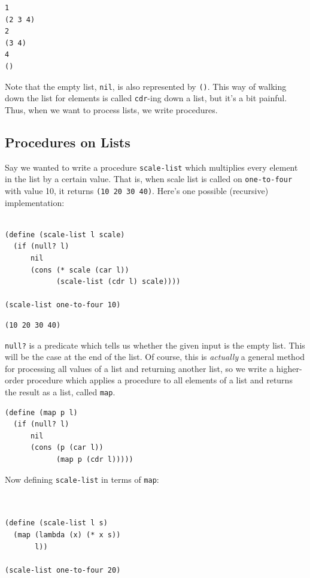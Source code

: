 \documentclass[9pt]{report}
\begin{document}
\begin{verbatim}
1
(2 3 4)
2
(3 4)
4
()
\end{verbatim}


Note that the empty list, \texttt{nil}, is also represented by \texttt{()}. This
way of walking down the list for elements is called \texttt{cdr}-ing down
a list, but it's a bit painful. Thus, when we want to process
lists, we write procedures.

\subsection{Procedures on Lists}
\label{sec:org3c9b0e9}

Say we wanted to write a procedure \texttt{scale-list} which multiplies
every element in the list by a certain value. That is, when scale
list is called on \texttt{one-to-four} with value 10, it returns \texttt{(10 20
    30 40)}. Here's one possible (recursive) implementation:

\begin{verbatim}

(define (scale-list l scale)
  (if (null? l)
      nil
      (cons (* scale (car l))
            (scale-list (cdr l) scale))))

(scale-list one-to-four 10)
\end{verbatim}

\begin{verbatim}
(10 20 30 40)
\end{verbatim}


\texttt{null?} is a predicate which tells us whether the given input is
the empty list. This will be the case at the end of the list.
Of course, this is \emph{actually} a general method for processing all
values of a list and returning another list, so we write a
higher-order procedure which applies a procedure to all elements
of a list and returns the result as a list, called \texttt{map}.

\begin{verbatim}
(define (map p l)
  (if (null? l)
      nil
      (cons (p (car l))
            (map p (cdr l)))))
\end{verbatim}

Now defining \texttt{scale-list} in terms of \texttt{map}:

\begin{verbatim}


(define (scale-list l s)
  (map (lambda (x) (* x s))
       l))

(scale-list one-to-four 20)
\end{verbatim}
\end{document}
